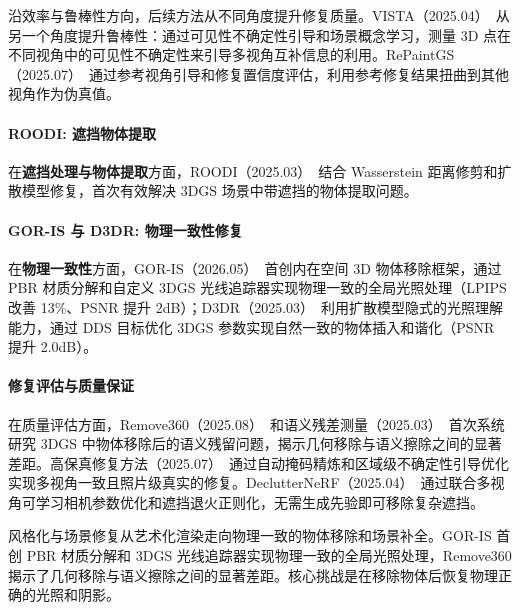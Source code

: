 沿效率与鲁棒性方向，后续方法从不同角度提升修复质量。VISTA（2025.04）~\cite{2504_17815}从另一个角度提升鲁棒性：通过可见性不确定性引导和场景概念学习，测量 3D 点在不同视角中的可见性不确定性来引导多视角互补信息的利用。RePaintGS（2025.07）~\cite{2507_08434}通过参考视角引导和修复置信度评估，利用参考修复结果扭曲到其他视角作为伪真值。

\paragraph{ROODI: 遮挡物体提取}

在\textbf{遮挡处理与物体提取}方面，ROODI（2025.03）~\cite{2503_10256}结合 Wasserstein 距离修剪和扩散模型修复，首次有效解决 3DGS 场景中带遮挡的物体提取问题。

\paragraph{GOR-IS 与 D3DR: 物理一致性修复}

在\textbf{物理一致性}方面，GOR-IS（2026.05）~\cite{2605_00498}首创内在空间 3D 物体移除框架，通过 PBR 材质分解和自定义 3DGS 光线追踪器实现物理一致的全局光照处理（LPIPS 改善 13\%、PSNR 提升 2dB）；D3DR（2025.03）~\cite{2503_06740}利用扩散模型隐式的光照理解能力，通过 DDS 目标优化 3DGS 参数实现自然一致的物体插入和谐化（PSNR 提升 2.0dB）。

\paragraph{修复评估与质量保证}

在质量评估方面，Remove360（2025.08）~\cite{2508_11431}和语义残差测量（2025.03）~\cite{2503_17574}首次系统研究 3DGS 中物体移除后的语义残留问题，揭示几何移除与语义擦除之间的显著差距。高保真修复方法（2025.07）~\cite{2507_18023}通过自动掩码精炼和区域级不确定性引导优化实现多视角一致且照片级真实的修复。DeclutterNeRF（2025.04）~\cite{2504_04679}通过联合多视角可学习相机参数优化和遮挡退火正则化，无需生成先验即可移除复杂遮挡。

\begin{takeaway}
风格化与场景修复从艺术化渲染走向物理一致的物体移除和场景补全。GOR-IS 首创 PBR 材质分解和 3DGS 光线追踪器实现物理一致的全局光照处理，Remove360 揭示了几何移除与语义擦除之间的显著差距。核心挑战是在移除物体后恢复物理正确的光照和阴影。
\end{takeaway}


